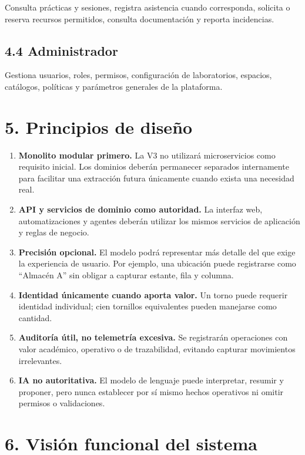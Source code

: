 \documentclass[12pt]{article}
\begin{document}
Consulta prácticas y sesiones, registra asistencia cuando corresponda, solicita o reserva recursos permitidos, consulta documentación y reporta incidencias.

\subsection*{4.4 Administrador}

Gestiona usuarios, roles, permisos, configuración de laboratorios, espacios, catálogos, políticas y parámetros generales de la plataforma.

\section*{5. Principios de diseño}

\begin{enumerate}[label=PD\arabic*., leftmargin=1.4cm]
    \item \textbf{Monolito modular primero.} La V3 no utilizará microservicios como requisito inicial. Los dominios deberán permanecer separados internamente para facilitar una extracción futura únicamente cuando exista una necesidad real.
    \item \textbf{API y servicios de dominio como autoridad.} La interfaz web, automatizaciones y agentes deberán utilizar los mismos servicios de aplicación y reglas de negocio.
    \item \textbf{Precisión opcional.} El modelo podrá representar más detalle del que exige la experiencia de usuario. Por ejemplo, una ubicación puede registrarse como ``Almacén A'' sin obligar a capturar estante, fila y columna.
    \item \textbf{Identidad únicamente cuando aporta valor.} Un torno puede requerir identidad individual; cien tornillos equivalentes pueden manejarse como cantidad.
    \item \textbf{Auditoría útil, no telemetría excesiva.} Se registrarán operaciones con valor académico, operativo o de trazabilidad, evitando capturar movimientos irrelevantes.
    \item \textbf{IA no autoritativa.} El modelo de lenguaje puede interpretar, resumir y proponer, pero nunca establecer por sí mismo hechos operativos ni omitir permisos o validaciones.
\end{enumerate}

\section*{6. Visión funcional del sistema}
\end{document}
